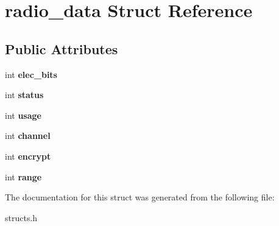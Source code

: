 \hypertarget{structradio__data}{\section{radio\-\_\-data Struct Reference}
\label{structradio__data}
}
\subsection*{Public Attributes}
\begin{DoxyCompactItemize}
\item 
\hypertarget{structradio__data_a979087a195c4253ee9fe1913edd4fa4b}{int {\bfseries elec\-\_\-bits}}\label{structradio__data_a979087a195c4253ee9fe1913edd4fa4b}

\item 
\hypertarget{structradio__data_a4335da12f27e590f42298c2794a2c3a3}{int {\bfseries status}}\label{structradio__data_a4335da12f27e590f42298c2794a2c3a3}

\item 
\hypertarget{structradio__data_acdf7274e14930ea7a9fa1d393482b1d7}{int {\bfseries usage}}\label{structradio__data_acdf7274e14930ea7a9fa1d393482b1d7}

\item 
\hypertarget{structradio__data_a0b1783d8c0fd34039fe105448606b66e}{int {\bfseries channel}}\label{structradio__data_a0b1783d8c0fd34039fe105448606b66e}

\item 
\hypertarget{structradio__data_ac0c2b129bde556a3e3ea8690e1c4adca}{int {\bfseries encrypt}}\label{structradio__data_ac0c2b129bde556a3e3ea8690e1c4adca}

\item 
\hypertarget{structradio__data_a013678e8f4bdb0bcd7365b1e289b908d}{int {\bfseries range}}\label{structradio__data_a013678e8f4bdb0bcd7365b1e289b908d}

\end{DoxyCompactItemize}


The documentation for this struct was generated from the following file\-:\begin{DoxyCompactItemize}
\item 
structs.\-h\end{DoxyCompactItemize}
